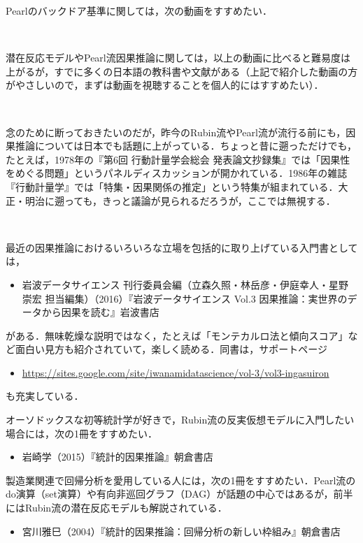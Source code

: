 \documentclass[12pt]{jsarticle}
\begin{document}
Pearlのバックドア基準に関しては，次の動画をすすめたい．


\

潜在反応モデルやPearl流因果推論に関しては，以上の動画に比べると難易度は上がるが，すでに多くの日本語の教科書や文献がある（上記で紹介した動画の方がやさしいので，まずは動画を視聴することを個人的にはすすめたい）．

\

念のために断っておきたいのだが，昨今のRubin流やPearl流が流行る前にも，因果推論については日本でも話題に上がっている．ちょっと昔に遡っただけでも，たとえば，1978年の『第6回 行動計量学会総会 発表論文抄録集』では「因果性をめぐる問題」というパネルディスカッションが開かれている．1986年の雑誌『行動計量学』では「特集・因果関係の推定」という特集が組まれている．大正・明治に遡っても，きっと議論が見られるだろうが，ここでは無視する．

\

最近の因果推論におけるいろいろな立場を包括的に取り上げている入門書としては，
\begin{itemize}
\item[] 岩波データサイエンス 刊行委員会編（立森久照・林岳彦・伊庭幸人・星野崇宏 担当編集）（2016）『岩波データサイエンス  Vol.3  因果推論：実世界のデータから因果を読む』岩波書店
\end{itemize}
がある．無味乾燥な説明ではなく，たとえば「モンテカルロ法と傾向スコア」など面白い見方も紹介されていて，楽しく読める．同書は，サポートページ
\begin{itemize}
\item[] \url{ https://sites.google.com/site/iwanamidatascience/vol-3/vol3-ingasuiron}
\end{itemize}
も充実している．

オーソドックスな初等統計学が好きで，Rubin流の反実仮想モデルに入門したい場合には，次の1冊をすすめたい．
\begin{itemize}
\item[] 岩崎学（2015）『統計的因果推論』朝倉書店
\end{itemize}

製造業関連で回帰分析を愛用している人には，次の1冊をすすめたい．Pearl流のdo演算（set演算）や有向非巡回グラフ（DAG）が話題の中心ではあるが，前半にはRubin流の潜在反応モデルも解説されている．
\begin{itemize}
\item[] 宮川雅巳（2004）『統計的因果推論：回帰分析の新しい枠組み』朝倉書店
\end{itemize}
\end{document}
